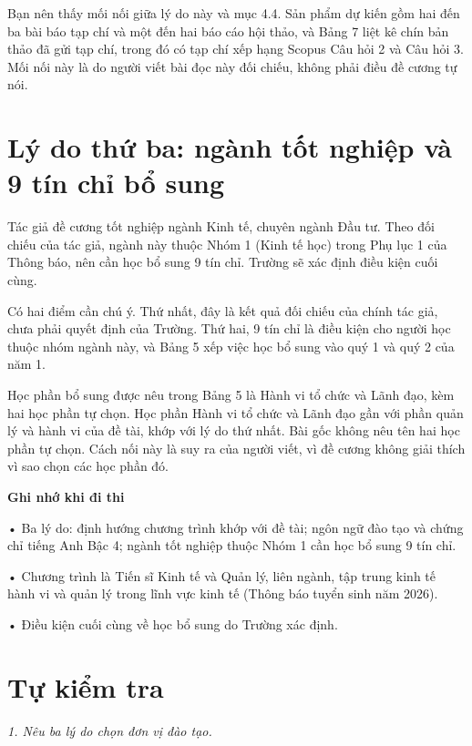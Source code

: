 Bạn nên thấy mối nối giữa lý do này và mục 4.4. Sản phẩm dự kiến gồm hai đến ba bài báo tạp chí và một đến hai báo cáo hội thảo, và Bảng 7 liệt kê chín bản thảo đã gửi tạp chí, trong đó có tạp chí xếp hạng Scopus Câu hỏi 2 và Câu hỏi 3. Mối nối này là do người viết bài đọc này đối chiếu, không phải điều đề cương tự nói.

\section{Lý do thứ ba: ngành tốt nghiệp và 9 tín chỉ bổ sung}

Tác giả đề cương tốt nghiệp ngành Kinh tế, chuyên ngành Đầu tư. Theo đối chiếu của tác giả, ngành này thuộc Nhóm 1 (Kinh tế học) trong Phụ lục 1 của Thông báo, nên cần học bổ sung 9 tín chỉ. Trường sẽ xác định điều kiện cuối cùng.

Có hai điểm cần chú ý. Thứ nhất, đây là kết quả đối chiếu của chính tác giả, chưa phải quyết định của Trường. Thứ hai, 9 tín chỉ là điều kiện cho người học thuộc nhóm ngành này, và Bảng 5 xếp việc học bổ sung vào quý 1 và quý 2 của năm 1.

Học phần bổ sung được nêu trong Bảng 5 là Hành vi tổ chức và Lãnh đạo, kèm hai học phần tự chọn. Học phần Hành vi tổ chức và Lãnh đạo gần với phần quản lý và hành vi của đề tài, khớp với lý do thứ nhất. Bài gốc không nêu tên hai học phần tự chọn. Cách nối này là suy ra của người viết, vì đề cương không giải thích vì sao chọn các học phần đó.

\begin{tcolorbox}[breakable]
\textbf{Ghi nhớ khi đi thi}

• Ba lý do: định hướng chương trình khớp với đề tài; ngôn ngữ đào tạo và chứng chỉ tiếng Anh Bậc 4; ngành tốt nghiệp thuộc Nhóm 1 cần học bổ sung 9 tín chỉ.

• Chương trình là Tiến sĩ Kinh tế và Quản lý, liên ngành, tập trung kinh tế hành vi và quản lý trong lĩnh vực kinh tế (Thông báo tuyển sinh năm 2026).

• Điều kiện cuối cùng về học bổ sung do Trường xác định.
\end{tcolorbox}

\section{Tự kiểm tra}

{\itshape 1. Nêu ba lý do chọn đơn vị đào tạo.\par}

